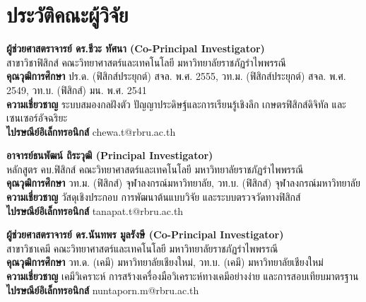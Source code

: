 \documentclass[12pt,a4paper,oneside]{report}
\begin{document}
\chapter*{ประวัติคณะผู้วิจัย}

\begin{tcolorbox}[enhanced, colback=white, colframe=rbruNavy, arc=3mm, boxrule=1pt]
\textbf{\large ผู้ช่วยศาสตราจารย์ ดร.ชีวะ ทัศนา (Co-Principal Investigator)}\\
สาขาวิชาฟิสิกส์ คณะวิทยาศาสตร์และเทคโนโลยี มหาวิทยาลัยราชภัฏรำไพพรรณี\\
\textbf{คุณวุฒิการศึกษา} ปร.ด. (ฟิสิกส์ประยุกต์) สจล. พ.ศ. 2555, วท.ม. (ฟิสิกส์ประยุกต์) สจล. พ.ศ. 2549, วท.บ. (ฟิสิกส์) มน. พ.ศ. 2541\\
\textbf{ความเชี่ยวชาญ} ระบบสมองกลฝังตัว ปัญญาประดิษฐ์และการเรียนรู้เชิงลึก เกษตรฟิสิกส์ดิจิทัล และเซนเซอร์อัจฉริยะ\\
\textbf{ไปรษณีย์อิเล็กทรอนิกส์} chewa.t@rbru.ac.th
\end{tcolorbox}

\vspace{4mm}

\begin{tcolorbox}[enhanced, colback=white, colframe=rbruSlate, arc=3mm, boxrule=1pt]
\textbf{\large อาจารย์ธนพัฒน์ ถิระวุฒิ (Principal Investigator)}\\
หลักสูตร คบ.ฟิสิกส์ คณะวิทยาศาสตร์และเทคโนโลยี มหาวิทยาลัยราชภัฏรำไพพรรณี\\
\textbf{คุณวุฒิการศึกษา} วท.ม. (ฟิสิกส์) จุฬาลงกรณ์มหาวิทยาลัย, วท.บ. (ฟิสิกส์) จุฬาลงกรณ์มหาวิทยาลัย\\
\textbf{ความเชี่ยวชาญ} วัสดุเชิงประกอบ การพัฒนาต้นแบบวิจัย และระบบตรวจวัดทางฟิสิกส์\\
\textbf{ไปรษณีย์อิเล็กทรอนิกส์} tanapat.t@rbru.ac.th
\end{tcolorbox}

\vspace{4mm}

\begin{tcolorbox}[enhanced, colback=white, colframe=rbruGreen, arc=3mm, boxrule=1pt]
\textbf{\large ผู้ช่วยศาสตราจารย์ ดร.นันทพร มูลรังษี (Co-Principal Investigator)}\\
สาขาวิชาเคมี คณะวิทยาศาสตร์และเทคโนโลยี มหาวิทยาลัยราชภัฏรำไพพรรณี\\
\textbf{คุณวุฒิการศึกษา} วท.ด. (เคมี) มหาวิทยาลัยเชียงใหม่, วท.บ. (เคมี) มหาวิทยาลัยเชียงใหม่\\
\textbf{ความเชี่ยวชาญ} เคมีวิเคราะห์ การสร้างเครื่องมือวิเคราะห์ทางเคมีอย่างง่าย และการสอบเทียบมาตรฐาน\\
\textbf{ไปรษณีย์อิเล็กทรอนิกส์} nuntaporn.m@rbru.ac.th
\end{tcolorbox}
\end{document}
